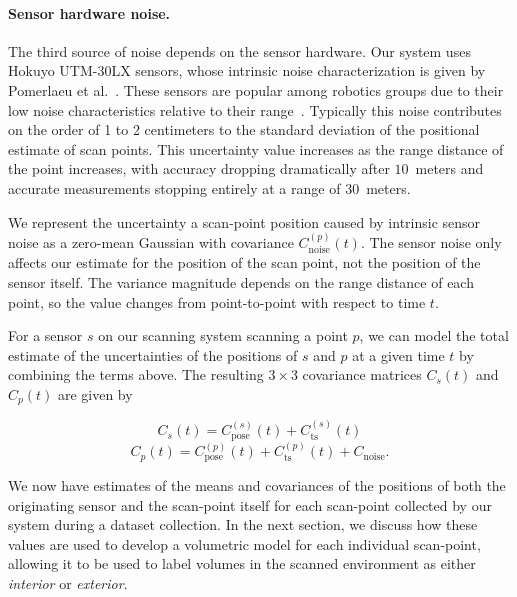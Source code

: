 \documentclass[12pt,onecolumn,oneside]{book}
\begin{document}
\paragraph*{Sensor hardware noise.}
The third source of noise depends on the sensor hardware.  Our system uses Hokuyo UTM-30LX sensors, whose intrinsic noise characterization is given by Pomerlaeu et al.~\cite{Pomerleau12}.  These sensors are popular among robotics groups due to their low noise characteristics relative to their range~\cite{GTSAM14}.  Typically this noise contributes on the order of 1 to 2 centimeters to the standard deviation of the positional estimate of scan points.  This uncertainty value increases as the range distance of the point increases, with accuracy dropping dramatically after $10$~meters and accurate measurements stopping entirely at a range of $30$~meters.  

We represent the uncertainty a scan-point position caused by intrinsic sensor noise as a zero-mean Gaussian with covariance $C^{(p)}_{\mathrm{noise}}(t)$.  The sensor noise only affects our estimate for the position of the scan point, not the position of the sensor itself.  The variance magnitude depends on the range distance of each point, so the value changes from point-to-point with respect to time $t$.

For a sensor $s$ on our scanning system scanning a point $p$, we can model the total estimate of the uncertainties of the positions of $s$ and $p$ at a given time $t$ by combining the terms above.  The resulting $3 \times 3$ covariance matrices $C_s(t)$ and $C_p(t)$ are given by

\begin{equation}
	C_s(t) = C^{(s)}_{\mathrm{pose}}(t) + C^{(s)}_{\mathrm{ts}}(t)
\end{equation}
\begin{equation}
	C_p(t) = C^{(p)}_{\mathrm{pose}}(t) + C^{(p)}_{\mathrm{ts}}(t) + C_{\mathrm{noise}}.
\end{equation}

\noindent We now have estimates of the means and covariances of the positions of both the originating sensor and the scan-point itself for each scan-point collected by our system during a dataset collection.  In the next section, we discuss how these values are used to develop a volumetric model for each individual scan-point, allowing it to be used to label volumes in the scanned environment as either {\it interior} or {\it exterior}.

\end{document}
